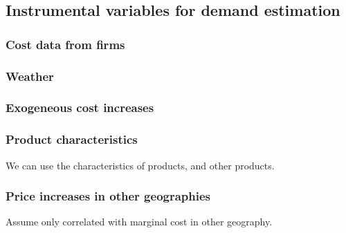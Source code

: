 
\subsection{Instrumental variables for demand estimation}

\subsubsection{Cost data from firms}

\subsubsection{Weather}

\subsubsection{Exogeneous cost increases}

\subsubsection{Product characteristics}

We can use the characteristics of products, and other products.

\subsubsection{Price increases in other geographies}

Assume only correlated with marginal cost in other geography.

